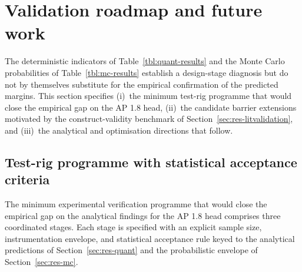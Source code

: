 
\section{Validation roadmap and future work}\label{sec:roadmap}

The deterministic indicators of Table~\ref{tbl:quant-results} and the
Monte Carlo probabilities of Table~\ref{tbl:mc-results} establish a
design-stage diagnosis but do not by themselves substitute for the
empirical confirmation of the predicted margins. This section
specifies (i)~the minimum test-rig programme that would close the
empirical gap on the AP 1.8 head, (ii)~the candidate barrier
extensions motivated by the construct-validity benchmark of
Section~\ref{sec:res-litvalidation}, and (iii)~the analytical and
optimisation directions that follow.

\subsection{Test-rig programme with statistical acceptance criteria}
\label{sec:roadmap-rig}

The minimum experimental verification programme that would close the
empirical gap on the analytical findings for the AP 1.8 head
comprises three coordinated stages. Each stage is specified with an
explicit sample size, instrumentation envelope, and statistical
acceptance rule keyed to the analytical predictions of
Section~\ref{sec:res-quant} and the probabilistic envelope of
Section~\ref{sec:res-mc}.

